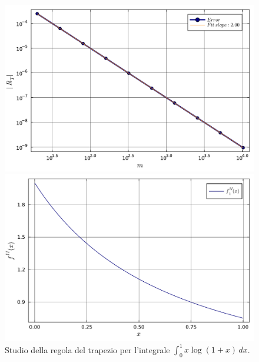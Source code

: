 \documentclass[letterpaper, 12pt]{article}
\begin{document}
\begin{figure}[!ht]
    \centering
    \begin{minipage}[b]{0.47\textwidth}
        \includegraphics[width=\textwidth]{5121.pdf}
    \end{minipage}
    \hspace{0.5cm}
    \begin{minipage}[b]{0.47\textwidth}
        \includegraphics[width=\textwidth]{5121_2.pdf}
    \end{minipage}
    \caption{Studio della regola del trapezio per l'integrale $\int_0^1 x\log(1+x)\, dx$.}
    \label{fig:es5_1_2_1}
\end{figure}
\end{document}
